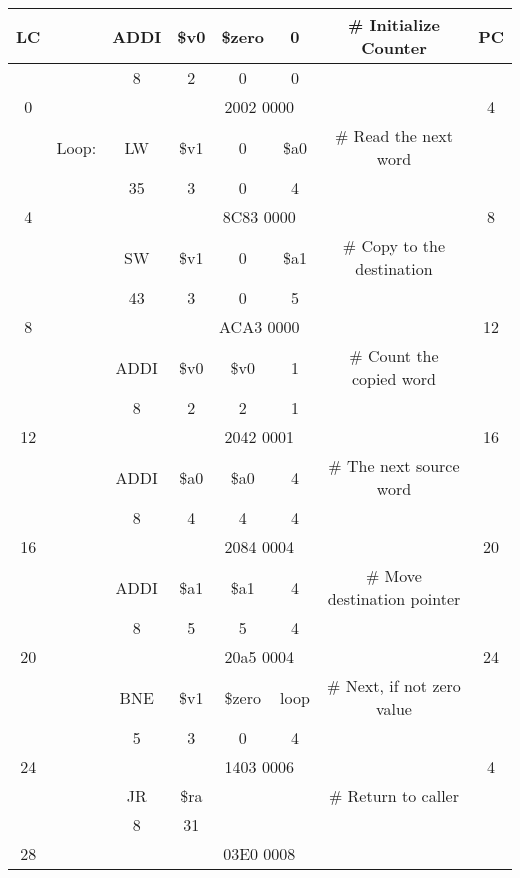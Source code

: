 \documentclass[a4paper,11pt]{article}
\begin{document}
\begin{tabular}{ | c | c | c | c | c | c | c | c | }
  \hline
    LC & & ADDI & \$v0 & \$zero & 0 & \# Initialize Counter & PC \\ \hline
          & & 8 & 2 & 0 & 0 &   &   \\ \hline
     0   &   \multicolumn{6}{|c|}{2002 0000} & 4 \\ \hline
          & Loop: & LW & \$v1 & 0 & \$a0 & \# Read the next word &  \\ \hline
          & & 35 & 3 & 0 & 4 &   &   \\ \hline
     4   &   \multicolumn{6}{|c|}{8C83 0000} & 8 \\ \hline
          & & SW & \$v1 & 0 & \$a1 & \# Copy to the destination &  \\ \hline
          & & 43 & 3 & 0 & 5 &   &   \\ \hline
     8   &   \multicolumn{6}{|c|}{ACA3 0000} & 12 \\ \hline
          & & ADDI & \$v0 & \$v0 & 1 & \# Count the copied word &  \\ \hline
          & & 8 & 2 & 2 & 1 &   &   \\ \hline
     12   &   \multicolumn{6}{|c|}{2042 0001} & 16 \\ \hline
          & & ADDI & \$a0 & \$a0 & 4 & \# The next source word &  \\ \hline
          & & 8 & 4 & 4 & 4 &   &   \\ \hline
     16   &   \multicolumn{6}{|c|}{2084 0004} & 20 \\ \hline
          & & ADDI & \$a1 & \$a1 & 4 & \# Move destination pointer &  \\ \hline
          & & 8 & 5 & 5 & 4 &   &   \\ \hline
     20   &   \multicolumn{6}{|c|}{20a5 0004} & 24 \\ \hline
          & & BNE& \$v1 & \$zero & loop & \# Next, if not zero value &  \\ \hline
          & & 5 & 3 & 0 & 4 &   &   \\ \hline
     24   &   \multicolumn{6}{|c|}{1403 0006} & 4 \\ \hline
          & & JR & \$ra &  &  & \# Return to caller &  \\ \hline
          & & 8 & 31 & &  &   &   \\ \hline
     28  &   \multicolumn{6}{|c|}{03E0 0008} &  \\ \hline
\end{tabular}

\end{document}
